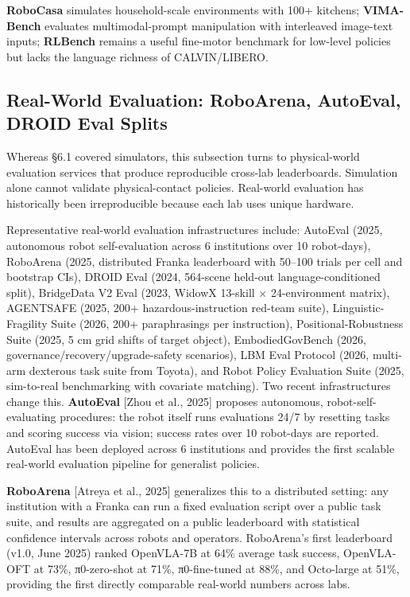 \textbf{RoboCasa} simulates household-scale environments with 100+ kitchens; \textbf{VIMA-Bench} evaluates multimodal-prompt manipulation with interleaved image-text inputs; \textbf{RLBench} remains a useful fine-motor benchmark for low-level policies but lacks the language richness of CALVIN/LIBERO.

\subsection{Real-World Evaluation: RoboArena, AutoEval, DROID Eval Splits}\label{real-world-evaluation-roboarena-autoeval-droid-eval-splits}

Whereas §6.1 covered simulators, this subsection turns to physical-world evaluation services that produce reproducible cross-lab leaderboards. Simulation alone cannot validate physical-contact policies. Real-world evaluation has historically been irreproducible because each lab uses unique hardware.

Representative real-world evaluation infrastructures include: AutoEval (2025, autonomous robot self-evaluation across 6 institutions over 10 robot-days), RoboArena (2025, distributed Franka leaderboard with 50--100 trials per cell and bootstrap CIs), DROID Eval (2024, 564-scene held-out language-conditioned split), BridgeData V2 Eval (2023, WidowX 13-skill × 24-environment matrix), AGENTSAFE (2025, 200+ hazardous-instruction red-team suite), Linguistic-Fragility Suite (2026, 200+ paraphrasings per instruction), Positional-Robustness Suite (2025, 5 cm grid shifts of target object), EmbodiedGovBench (2026, governance/recovery/upgrade-safety scenarios), LBM Eval Protocol (2026, multi-arm dexterous task suite from Toyota), and Robot Policy Evaluation Suite (2025, sim-to-real benchmarking with covariate matching). Two recent infrastructures change this. \textbf{AutoEval} {[}Zhou et al., 2025{]} proposes autonomous, robot-self-evaluating procedures: the robot itself runs evaluations 24/7 by resetting tasks and scoring success via vision; success rates over 10 robot-days are reported. AutoEval has been deployed across 6 institutions and provides the first scalable real-world evaluation pipeline for generalist policies.

\textbf{RoboArena} {[}Atreya et al., 2025{]} generalizes this to a distributed setting: any institution with a Franka can run a fixed evaluation script over a public task suite, and results are aggregated on a public leaderboard with statistical confidence intervals across robots and operators. RoboArena's first leaderboard (v1.0, June 2025) ranked OpenVLA-7B at 64\% average task success, OpenVLA-OFT at 73\%, π0-zero-shot at 71\%, π0-fine-tuned at 88\%, and Octo-large at 51\%, providing the first directly comparable real-world numbers across labs.

